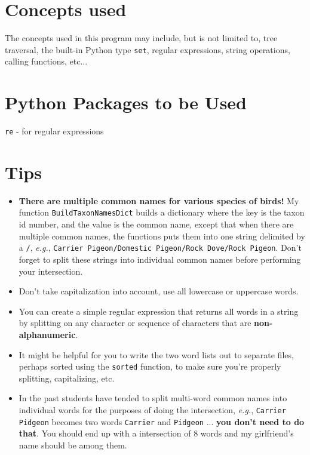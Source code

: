 \documentclass[11pt]{amsart}
\begin{document}
\section*{Concepts used}
The concepts used in this program may include, but is not limited to, tree traversal, the built-in Python type \texttt{set}, regular expressions, string operations, calling functions, etc...

\section*{Python Packages to be Used}
\texttt{re} - for regular expressions

\section*{Tips}
\begin{itemize}
  \item \textbf{There are multiple common names for various species of birds!} My function \texttt{BuildTaxonNamesDict} builds a dictionary where the key is the taxon id number, and the value is the common name, except that when there are multiple common names, the functions puts them into one string delimited by a \texttt{/}, \textit{e.g.}, \texttt{Carrier Pigeon/Domestic Pigeon/Rock Dove/Rock Pigeon}. Don't forget to split these strings into individual common names before performing your intersection.
  \item Don't take capitalization into account, use all lowercase or uppercase words.
  \item You can create a simple regular expression that returns all words in a string by splitting on any character or sequence of characters that are \textbf{non-alphanumeric}.
  \item It might be helpful for you to write the two word lists out to separate files, perhaps sorted using the \texttt{sorted} function, to make sure you're properly splitting, capitalizing, etc.
  \item In the past students have tended to split multi-word common names into individual words for the purposes of doing the intersection, \textit{e.g.}, \texttt{Carrier Pidgeon} becomes two words \texttt{Carrier} and \texttt{Pidgeon} ... \textbf{you don't need to do that}. You should end up with a intersection of 8 words and my girlfriend's name should be among them.
\end{itemize}
\end{document}
